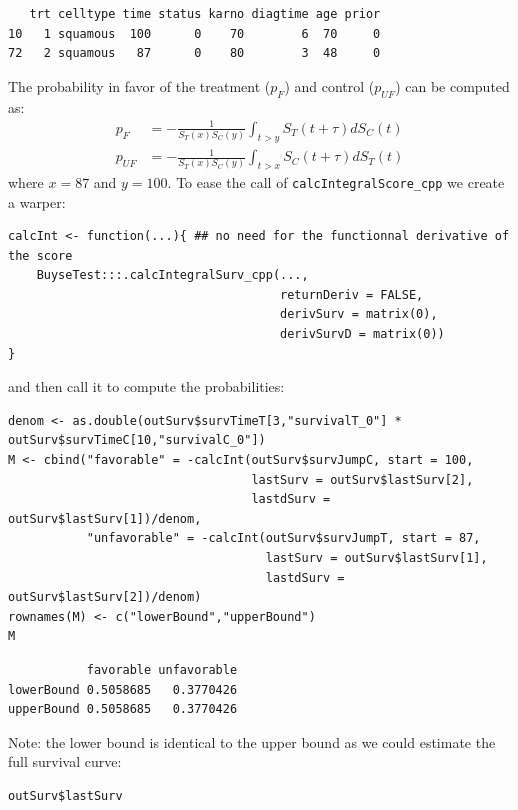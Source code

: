 \documentclass[12pt]{article}
\begin{document}
\begin{verbatim}
   trt celltype time status karno diagtime age prior
10   1 squamous  100      0    70        6  70     0
72   2 squamous   87      0    80        3  48     0
\end{verbatim}


The probability in favor of the treatment (\(p_F\)) and control (\(p_{UF}\)) can be computed
as:
\begin{align*}
p_F &= -\frac{1}{S_T(x)S_C(y)}\int_{t>y} S_T(t+\tau) dS_C(t) \\
p_{UF} &= -\frac{1}{S_T(x)S_C(y)}\int_{t>x} S_C(t+\tau) dS_T(t)
\end{align*}
where \(x=87\) and \(y=100\). To ease the call of \texttt{calcIntegralScore\_cpp} we create a warper:
\lstset{language=r,label= ,caption= ,captionpos=b,numbers=none}
\begin{lstlisting}
calcInt <- function(...){ ## no need for the functionnal derivative of the score 
    BuyseTest:::.calcIntegralSurv_cpp(..., 
                                      returnDeriv = FALSE, 
                                      derivSurv = matrix(0), 
                                      derivSurvD = matrix(0))
}
\end{lstlisting}

and then call it to compute the probabilities:
\lstset{language=r,label= ,caption= ,captionpos=b,numbers=none}
\begin{lstlisting}
denom <- as.double(outSurv$survTimeT[3,"survivalT_0"] * outSurv$survTimeC[10,"survivalC_0"])
M <- cbind("favorable" = -calcInt(outSurv$survJumpC, start = 100, 
                                  lastSurv = outSurv$lastSurv[2],
                                  lastdSurv = outSurv$lastSurv[1])/denom,
           "unfavorable" = -calcInt(outSurv$survJumpT, start = 87, 
                                    lastSurv = outSurv$lastSurv[1],
                                    lastdSurv = outSurv$lastSurv[2])/denom)
rownames(M) <- c("lowerBound","upperBound")
M
\end{lstlisting}

\begin{verbatim}
           favorable unfavorable
lowerBound 0.5058685   0.3770426
upperBound 0.5058685   0.3770426
\end{verbatim}


Note: the lower bound is identical to the upper bound as we could
estimate the full survival curve:
\lstset{language=r,label= ,caption= ,captionpos=b,numbers=none}
\begin{lstlisting}
outSurv$lastSurv
\end{lstlisting}
\end{document}

